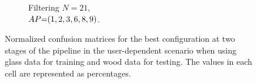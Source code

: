 \begin{figure}[ht]
\begin{subfigure}{.49\textwidth}
      \vspace{-15pt}
      \captionsetup{width=.99\linewidth}
      \caption{Filtering $N{=}21$, \\ $\splitatcommas{AP{=}(1, 2, 3, 6, 8, 9)}$.}
      \label{fig:radar-experiments:through-materials:glass-wood-confusion:filtering-ud}
  \end{subfigure}
  
  \vspace{-6pt}
  \caption{Normalized confusion matrices for the best configuration at two stages of the pipeline in the user-dependent scenario when using glass data for training and wood data for testing. The values in each cell are represented as percentages.}
  \label{fig:radar-experiments:through-materials:glass-wood-confusion}
\end{figure}




